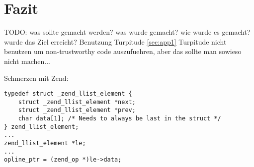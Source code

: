
\section{Fazit}
\label{sec:chap1:fazit}

TODO:
was sollte gemacht werden? was wurde gemacht? wie wurde es gemacht?
wurde das Ziel erreicht?
Benutzung Turpitude \ref{sec:app1}
Turpitude nicht benutzen um non-trustworthy code auszufuehren, aber das sollte man
sowieso nicht machen...

Schmerzen mit Zend:
\begin{lstlisting}[caption=lustiges Beispiel f"ur Zend-Code]
typedef struct _zend_llist_element {
    struct _zend_llist_element *next;
    struct _zend_llist_element *prev;
    char data[1]; /* Needs to always be last in the struct */
} zend_llist_element;
...
zend_llist_element *le;
...
opline_ptr = (zend_op *)le->data;
\end{lstlisting}


